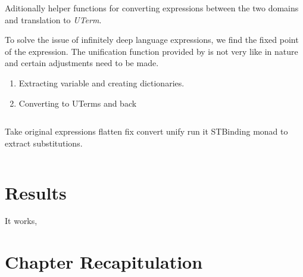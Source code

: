 \documentclass[thesis-solanki.tex]{subfiles}
\begin{document}
Aditionally helper functions for converting expressions between the two domains and translation to \textit{UTerm}.

To solve the issue of infinitely deep language expressions, we find the fixed point of the expression. The unification function provided by 
\cite{prolog-lib} is not very  like in nature and certain adjustments need to be made. 
\begin{enumerate}
\item Extracting variable and creating dictionaries.

\item Converting to UTerms and back
\end{enumerate}

\begin{singlespace}
  \inputminted[linenos]{haskell}{haskell-proto2-clean-lemur.hs}
\end{singlespace}

Take original expressions flatten fix convert unify
run it STBinding monad to extract substitutions.

\begin{singlespace}
  \inputminted[linenos]{haskell}{haskell-proto2-hearty-kayo.hs}
\end{singlespace}



\section{Results}

It works,



\section{Chapter Recapitulation}

\ifMain
\begin{scope}
  \nolinenumbers
  \enotesize
  \par
  \begin{singlespace}
  \setlength{\parskip}{12pt plus 2pt minus 1pt}
  \theendnotes
  \par
  \end{singlespace}
\end{scope}
\fi
\end{document}
